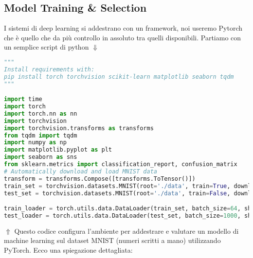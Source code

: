 \documentclass[a4paper,12pt]{article}
\begin{document}
\subsection{Model Training \& Selection}
I sistemi di deep learning si addestrano con un framework, noi useremo Pytorch che è quello che da più controllo in assoluto tra quelli disponibili. 
Partiamo con un semplice script di python $\Downarrow$
\begin{lstlisting}[language=Python, basicstyle=\ttfamily\footnotesize, breaklines=true, frame=single]
"""
Install requirements with:
pip install torch torchvision scikit-learn matplotlib seaborn tqdm
"""

import time 
import torch 
import torch.nn as nn 
import torchvision 
import torchvision.transforms as transforms
from tqdm import tqdm
import numpy as np 
import matplotlib.pyplot as plt 
import seaborn as sns 
from sklearn.metrics import classification_report, confusion_matrix 
# Automatically download and load MNIST data 
transform = transforms.Compose([transforms.ToTensor()])
train_set = torchvision.datasets.MNIST(root='./data', train=True, download=True, transform=transform)
test_set = torchvision.datasets.MNIST(root='./data', train=False, download=True, transform=transform)

train_loader = torch.utils.data.DataLoader(train_set, batch_size=64, shuffle=True)
test_loader = torch.utils.data.DataLoader(test_set, batch_size=1000, shuffle=False)
\end{lstlisting} 
$\Uparrow$ Questo codice configura l'ambiente per addestrare e valutare un modello di machine learning sul dataset MNIST (numeri scritti a mano) utilizzando PyTorch. Ecco una spiegazione dettagliata:
\end{document}
